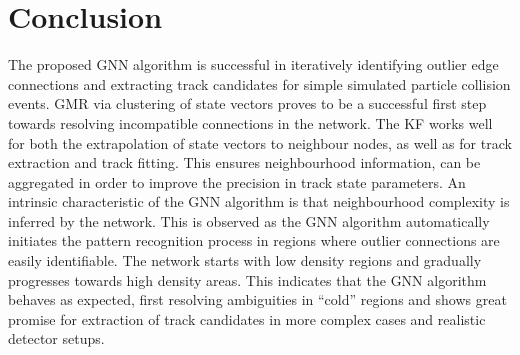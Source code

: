 \section{Conclusion}

The proposed GNN algorithm is successful in iteratively identifying outlier edge connections and extracting track candidates for simple simulated particle collision events. GMR via clustering of state vectors proves to be a successful first step towards resolving incompatible connections in the network. The KF works well for both the extrapolation of state vectors to neighbour nodes, as well as for track extraction and track fitting. This ensures neighbourhood information, can be aggregated in order to improve the precision in track state parameters. An intrinsic characteristic of the GNN algorithm is that neighbourhood complexity is inferred by the network. This is observed as the GNN algorithm automatically initiates the pattern recognition process in regions where outlier connections are easily identifiable. The network starts with low density regions and gradually progresses towards high density areas. This indicates that the GNN algorithm behaves as expected, first resolving ambiguities in ``cold'' regions and shows great promise for extraction of track candidates in more complex cases and realistic detector setups.
